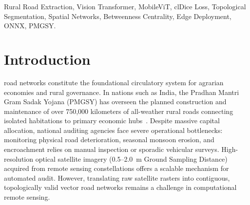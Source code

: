 \documentclass[conference]{IEEEtran}
\begin{document}
\begin{IEEEkeywords}
Rural Road Extraction, Vision Transformer, MobileViT, clDice Loss, Topological Segmentation, Spatial Networks, Betweenness Centrality, Edge Deployment, ONNX, PMGSY.
\end{IEEEkeywords}

\section{Introduction}
\label{sec:introduction}

 road networks constitute the foundational circulatory system for agrarian economies and rural governance. In nations such as India, the Pradhan Mantri Gram Sadak Yojana (PMGSY) has overseen the planned construction and maintenance of over 750,000 kilometers of all-weather rural roads connecting isolated habitations to primary economic hubs~\cite{pmgsy2023}. Despite massive capital allocation, national auditing agencies face severe operational bottlenecks: monitoring physical road deterioration, seasonal monsoon erosion, and encroachment relies on manual inspection or sporadic vehicular surveys. High-resolution optical satellite imagery (0.5--2.0~m Ground Sampling Distance) acquired from remote sensing constellations offers a scalable mechanism for automated audit. However, translating raw satellite rasters into contiguous, topologically valid vector road networks remains a challenge in computational remote sensing.
\end{document}
